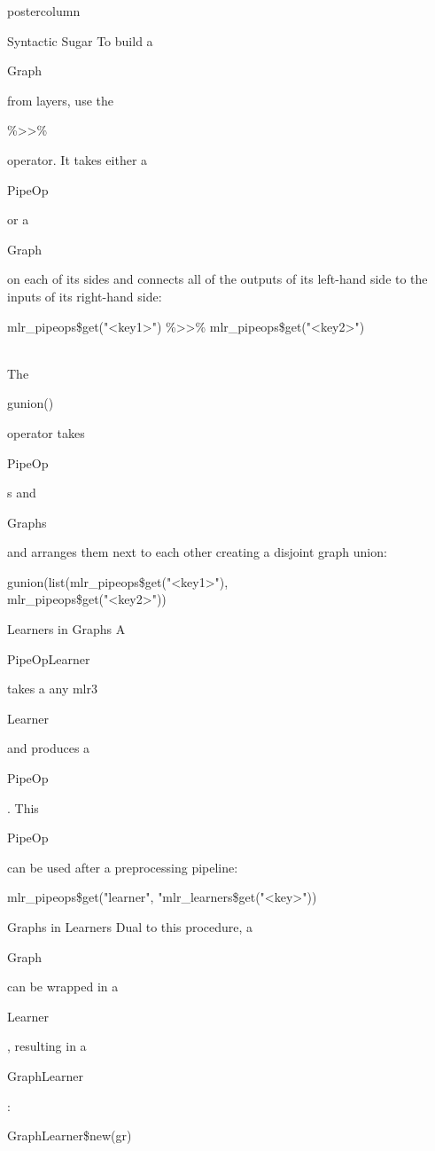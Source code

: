 \documentclass{beamer}
\newcommand{\codeinline}[1]{\begin{codeboxinline}#1\end{codeboxinline}}
\begin{document}
\begin{frame}[fragile]{}
\begin{columns}
\begin{column}{.245\textwidth}
\begin{beamercolorbox}[center]{postercolumn}
\begin{minipage}{.98\textwidth}
{            \begin{myblock}{Syntactic Sugar}
              To build a \codeinline{Graph} from layers, use the \codeinline{\%>>\%} operator. It takes either a \codeinline{PipeOp} or a \codeinline{Graph} on each of its sides and connects all of the outputs of its left-hand side to the inputs of its right-hand side:
              \begin{codeboxmultiline}[width=18cm]
                mlr\_pipeops\$get("<key1>") \%>>\%
                \hspace*{1ex}mlr\_pipeops\$get("<key2>")
              \end{codeboxmultiline}
              \ \\
              The \codeinline{gunion()} operator takes \codeinline{PipeOp}s and \codeinline{Graphs} and arranges them next to each other creating a disjoint graph union:
              \begin{codeboxmultiline}[width=20cm]
                gunion(list(mlr\_pipeops\$get("<key1>"),\\
                \hspace*{1ex}mlr\_pipeops\$get("<key2>"))
              \end{codeboxmultiline}
						\end{myblock}
						\begin{myblock}{Learners in Graphs}
              A \codeinline{PipeOpLearner} takes a any mlr3 \codeinline{Learner} and produces a \codeinline{PipeOp}. This \codeinline{PipeOp} can be used after a preprocessing pipeline:
              \begin{codebox}
                mlr\_pipeops\$get("learner", "mlr\_learners\$get("<key>"))
              \end{codebox}
            \end{myblock}
						\begin{myblock}{Graphs in Learners}
              Dual to this procedure, a \codeinline{Graph} can be wrapped in a \codeinline{Learner}, resulting in a \codeinline{GraphLearner}:
              \begin{codebox}
                GraphLearner\$new(gr)
              \end{codebox}
            \end{myblock}
						\vfill}
				\end{minipage}
			\end{beamercolorbox}
		\end{column}
    \begin{column}{.245\textwidth}

\end{column}
\end{columns}
\end{frame}
\end{document}
